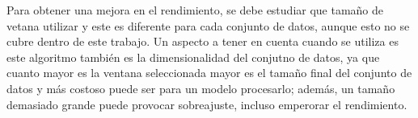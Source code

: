 Para obtener una mejora en el rendimiento, se debe estudiar que tamaño de vetana utilizar y este es diferente para cada conjunto de datos, aunque esto no se cubre dentro de este trabajo. Un aspecto a tener en cuenta cuando se utiliza es este algoritmo también es la dimensionalidad del conjutno de datos, ya que cuanto mayor es la ventana seleccionada mayor es el tamaño final del conjunto de datos y más costoso puede ser para un modelo procesarlo; además, un tamaño demasiado grande puede provocar sobreajuste, incluso emperorar el rendimiento.\newline




